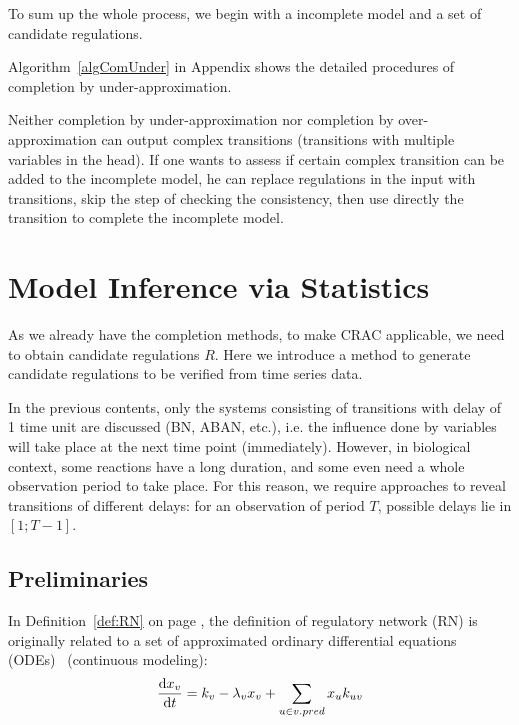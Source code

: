 To sum up the whole process, we begin with a incomplete model and a set of candidate regulations.


Algorithm~\ref{algComUnder} in Appendix shows the detailed procedures of completion by under-approximation.

\begin{remark}
Neither completion by under-approximation nor completion by over-approximation can output complex transitions (transitions with multiple variables in the head).
If one wants to assess if certain complex transition can be added to the incomplete model, he can replace regulations in the input with transitions, skip the step of checking the consistency, then use directly the transition to complete the incomplete model.
\end{remark}

\section{Model Inference via Statistics}
As we already have the completion methods, to make CRAC applicable, we need to obtain candidate regulations $R$.
Here we introduce a method to generate candidate regulations to be verified from time series data.

In the previous contents, only the systems consisting of transitions with delay of 1 time unit are discussed (BN, ABAN, etc.), i.e. the influence done by variables will take place at the next time point (immediately).
However, in biological context, some reactions have a long duration, and some even need a whole observation period to take place.
For this reason, we require approaches to reveal transitions of different delays: for an observation of period $T$, possible delays lie in $[1;T-1]$.

\subsection{Preliminaries}
In Definition~\ref{def:RN} on page \pageref{def:RN}, the definition of regulatory network (RN) is originally related to a set of approximated ordinary differential equations (ODEs)~\cite{khalis2009smbionet} (continuous modeling):
\begin{equation}\label{eq:differentialEquation}
    \dfrac{{\rm d}x_v}{{\rm d}t}=k_v-\lambda_v x_v +\sum_{u\in v.pred}{x_uk_{uv}}
\end{equation}

